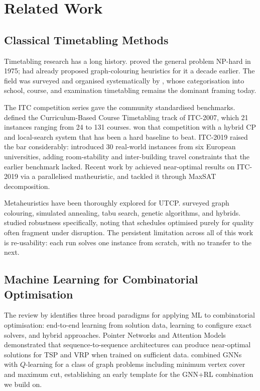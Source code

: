 \documentclass[conference]{IEEEtran}
\begin{document}
\section{Related Work}
\label{sec:related}

\subsection{Classical Timetabling Methods}

Timetabling research has a long history. \citet{even1975} proved the general problem NP-hard in 1975; \citet{welsh1967} had already proposed graph-colouring heuristics for it a decade earlier. The field was surveyed and organised systematically by \citet{schaerf1999}, whose categorisation into school, course, and examination timetabling remains the dominant framing today.

The ITC competition series gave the community standardised benchmarks. \citet{digaspero2007} defined the Curriculum-Based Course Timetabling track of ITC-2007, which 21 instances ranging from 24 to 131 courses. \citet{muller2009} won that competition with a hybrid CP and local-search system that has been a hard baseline to beat. ITC-2019 raised the bar considerably: \citet{muller2018} introduced 30 real-world instances from six European universities, adding room-stability and inter-building travel constraints that the earlier benchmark lacked. Recent work by \citet{mikkelsen2022} achieved near-optimal results on ITC-2019 via a parallelised matheuristic, and \citet{lemos2022} tackled it through MaxSAT decomposition.

Metaheuristics have been thoroughly explored for UTCP. \citet{lewis2008} surveyed graph colouring, simulated annealing, tabu search, genetic algorithms, and hybrids. \citet{akkan2018} studied robustness specifically, noting that schedules optimised purely for quality often fragment under disruption. The persistent limitation across all of this work is re-usability: each run solves one instance from scratch, with no transfer to the next.

\subsection{Machine Learning for Combinatorial Optimisation}

The review by \citet{bengio2021} identifies three broad paradigms for applying ML to combinatorial optimisation: end-to-end learning from solution data, learning to configure exact solvers, and hybrid approaches. Pointer Networks \cite{vinyals2015} and Attention Models \cite{kool2019} demonstrated that sequence-to-sequence architectures can produce near-optimal solutions for TSP and VRP when trained on sufficient data. \citet{khalil2017} combined GNNs with $Q$-learning for a class of graph problems including minimum vertex cover and maximum cut, establishing an early template for the GNN+RL combination we build on.
\end{document}
